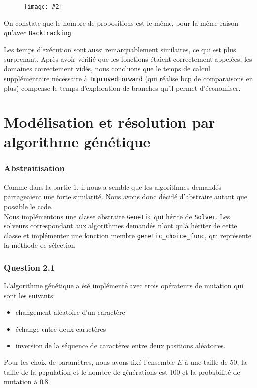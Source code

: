 \documentclass[a4paper, 12pt]{report}
\newcommand{\py}[1]{\texttt{#1}}
\newcommand{\cfigure}[3][6cm]{
	\begin{figure}[H]
		\centering
		\texttt{[image: \#2]}
	\end{figure}
}
\begin{document}
\cfigure[8cm]{q13.png}{}

On constate que le nombre de propositions est le même, pour la même raison qu'avec \py{Backtracking}.

Les temps d'exécution sont aussi remarquablement similaires, ce qui est plus surprenant. Après avoir vérifié que les fonctions étaient correctement appelées, les domaines correctement vidés, nous concluons que le temps de calcul supplémentaire nécessaire à \py{ImprovedForward} (qui réalise bcp de comparaisons en plus) compense le temps d'exploration de branches qu'il permet d'économiser.

\part*{Modélisation et résolution par algorithme génétique}

\section*{Abstraitisation}

Comme dans la partie 1, il nous a semblé que les algorithmes demandés partageaient une forte similarité. Nous avons donc décidé d'abstraire autant que possible le code. \\

Nous implémentons une classe abstraite \py{Genetic} qui hérite de \py{Solver}. Les solveurs correspondant aux algorithmes demandés n'ont qu'à hériter de cette classe et implémenter une fonction membre \py{genetic_choice_func}, qui représente la méthode de sélection

\section*{Question 2.1}

L'algorithme génétique a été implémenté avec trois opérateurs de mutation qui sont les suivants:
\begin{itemize}
	\item changement aléatoire d'un caractère
	\item échange entre deux caractères
	\item inversion de la séquence de caractères entre deux positions aléatoires.
\end{itemize}

Pour les choix de paramètres, nous avons fixé l'ensemble $E$ à une taille de 50, la taille de la population et le nombre de générations est 100 et la probabilité de mutation à 0.8.
\end{document}
